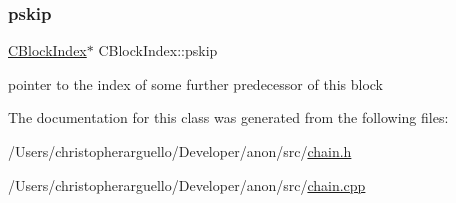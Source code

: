 \subsubsection{\texorpdfstring{pskip}{pskip}}
{\footnotesize\ttfamily \mbox{\hyperlink{class_c_block_index}{C\+Block\+Index}}$\ast$ C\+Block\+Index\+::pskip}



pointer to the index of some further predecessor of this block 



The documentation for this class was generated from the following files\+:\begin{DoxyCompactItemize}
\item 
/\+Users/christopherarguello/\+Developer/anon/src/\mbox{\hyperlink{chain_8h}{chain.\+h}}\item 
/\+Users/christopherarguello/\+Developer/anon/src/\mbox{\hyperlink{chain_8cpp}{chain.\+cpp}}\end{DoxyCompactItemize}
